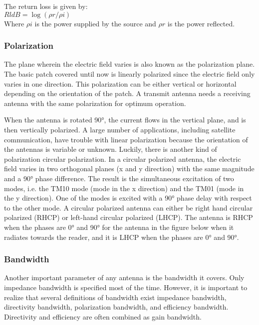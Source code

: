           The return loss is given by:
					\\
					         \centering
					          $RldB = \log⁡(\rho {r} / \rho i)$ \\ 

		  Where $\rho i $  is the power supplied by the source and $\rho r $ is the power reflected.

          \subsubsection{Polarization}\label{sub:Polarization}
           \justify
            The plane wherein the electric field varies is also known as the polarization plane. The
            basic patch covered until now is linearly polarized since the electric field only varies in one
            direction. This polarization can be either vertical or horizontal depending on the orientation of the patch. A transmit antenna needs a receiving antenna with the same polarization for optimum operation.
                        
             When the antenna is rotated 90°, the current flows in the vertical plane, and is then vertically polarized. A large number of applications, including satellite communication, have trouble with linear polarization because the orientation of the antennas is variable or unknown. Luckily, there is another kind of polarization circular polarization. In a circular polarized antenna, the electric field varies in two orthogonal planes (x and y direction) with the same magnitude and a 90° phase difference. The result is the simultaneous excitation of two modes, i.e. the TM10 mode (mode in the x direction) and the TM01 (mode in the y direction). One of the modes is excited with a 90° phase delay with respect to the other mode. A circular polarized antenna can either be right hand circular polarized (RHCP) or left-hand circular polarized (LHCP). The antenna is RHCP when the phases are 0° and 90° for the antenna in the figure below when it radiates towards the reader, and it is LHCP when the phases are 0° and 90°.

            \subsubsection{Bandwidth}
			 \justify
              Another important parameter of any antenna is the bandwidth it covers. Only impedance bandwidth is specified most of the time. However, it is important to realize that several definitions of bandwidth exist impedance bandwidth, directivity bandwidth, polarization bandwidth, and efficiency bandwidth. Directivity and efficiency are often combined as gain bandwidth.

